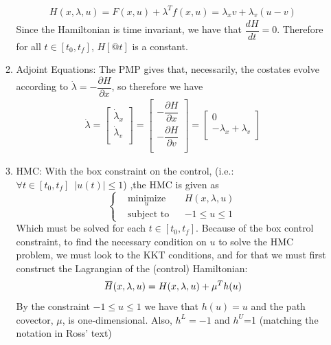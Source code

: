 \documentclass[10pt]{article}
\newcommand{\mat}[2][ccccccccccccccc]{\left [\!\!\begin{array}{#1} #2\\ \end{array} \!\!\right]}
\newcommand{\abs}[1]{ \left|#1\right|}
\newcommand{\libzptrl}[2]{\dfrac{\partial #1}{\partial #2} }
\newcommand{\libz}[2]{\dfrac{d #1}{d #2} }
\newcommand{\overbar}[1]{\mkern 1.5mu\overline{\mkern-1.5mu#1\mkern-1.5mu}\mkern 1.5mu}
\begin{document}
\begin{enumerate}[leftmargin=*]
\begin{enumerate}[label=\roman*]
              \begin{align*}
                H(x,\lambda, u) = F(x,u) + \lambda^Tf(x,u) = \lambda_x v + \lambda_v(u-v)
              \end{align*}
              Since the Hamiltonian is time invariant, we have that $\libz{H}{t}=0$.  Therefore for all $t\in[t_0,t_f]$, $H[@t]$ is a constant.
        \item Adjoint Equations: The PMP gives that, necessarily, the costates evolve according to $\dot\lambda = -\libzptrl{H}{x}$, so therefore we have
            \begin{align*}
                \dot\lambda = \mat{\dot\lambda_x \\ \dot\lambda_v }
                            = \mat{-\libzptrl{H}{x} \\[.8em] - \libzptrl{H}{v}}
                            = \mat{0 \\ -\lambda_x + \lambda_v}
            \end{align*}
        \item HMC:  With the box constraint on the control, (i.e.: $\forall t\in[t_0,t_f]\,\,\, \abs{u(t)}\le1$) ,the HMC is given as
                  \begin{equation} \label{eq:p1}
                  \left\{
                        \begin{aligned}
                            & \underset{u}{\text{minimize}}
                            & & H(x,\lambda,u) \\
                            & \text{subject to}
                            & & -1\le u \le 1
                            \end{aligned}
                             \right.
                  \end{equation}
                  Which must be solved for each $t\in[t_0,t_f]$.  Because of the box control constraint, to find the necessary condition on $u$ to solve the HMC problem, we must look to the KKT conditions, and for that we must first construct the Lagrangian of the (control) Hamiltonian:
                    \begin{align*}
                        \overbar H(x,\lambda,u) = H(x, \lambda, u) + \mu^Th(u)
                    \end{align*}
                  By the constraint $-1\le u \le 1$ we have that $h(u)=u$ and the path covector, $\mu$, is one-dimensional. Also, $h^L=-1$ and $h^U$=1 (matching the notation in Ross' text)
                   \begin{align*}

\end{align*}
\end{enumerate}
\end{enumerate}
\end{document}
